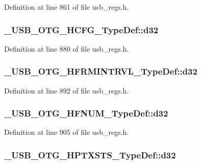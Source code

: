 Definition at line 861 of file usb\-\_\-regs.\-h.

\hypertarget{group___u_s_b___o_t_g___d_r_i_v_e_r_gacb1cab2cc5eb22cbf50cddd4c5409015}{
\subsubsection[{d32}]{ \-\_\-\-U\-S\-B\-\_\-\-O\-T\-G\-\_\-\-H\-C\-F\-G\-\_\-\-Type\-Def\-::d32}}\label{group___u_s_b___o_t_g___d_r_i_v_e_r_gacb1cab2cc5eb22cbf50cddd4c5409015}


Definition at line 880 of file usb\-\_\-regs.\-h.

\hypertarget{group___u_s_b___o_t_g___d_r_i_v_e_r_ga9f687d93bf8619d44c7bba5478bf9362}{
\subsubsection[{d32}]{ \-\_\-\-U\-S\-B\-\_\-\-O\-T\-G\-\_\-\-H\-F\-R\-M\-I\-N\-T\-R\-V\-L\-\_\-\-Type\-Def\-::d32}}\label{group___u_s_b___o_t_g___d_r_i_v_e_r_ga9f687d93bf8619d44c7bba5478bf9362}


Definition at line 892 of file usb\-\_\-regs.\-h.

\hypertarget{group___u_s_b___o_t_g___d_r_i_v_e_r_gafd506c89dade12ecf502cb311765a9f7}{
\subsubsection[{d32}]{ \-\_\-\-U\-S\-B\-\_\-\-O\-T\-G\-\_\-\-H\-F\-N\-U\-M\-\_\-\-Type\-Def\-::d32}}\label{group___u_s_b___o_t_g___d_r_i_v_e_r_gafd506c89dade12ecf502cb311765a9f7}


Definition at line 905 of file usb\-\_\-regs.\-h.

\hypertarget{group___u_s_b___o_t_g___d_r_i_v_e_r_ga37309ecbbd147a4d89043f7e73582dc4}{
\subsubsection[{d32}]{ \-\_\-\-U\-S\-B\-\_\-\-O\-T\-G\-\_\-\-H\-P\-T\-X\-S\-T\-S\-\_\-\-Type\-Def\-::d32}}\label{group___u_s_b___o_t_g___d_r_i_v_e_r_ga37309ecbbd147a4d89043f7e73582dc4}


